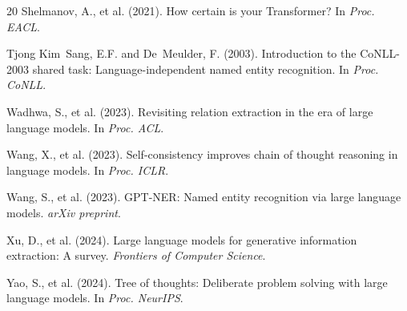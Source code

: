 \documentclass[11pt]{article}
\begin{document}
\begin{thebibliography}{20}
Shelmanov, A., et al. (2021).
\newblock How certain is your Transformer?
\newblock In \emph{Proc. EACL}.

Tjong Kim~Sang, E.F. and De~Meulder, F. (2003).
\newblock Introduction to the CoNLL-2003 shared task: Language-independent named entity recognition.
\newblock In \emph{Proc. CoNLL}.

Wadhwa, S., et al. (2023).
\newblock Revisiting relation extraction in the era of large language models.
\newblock In \emph{Proc. ACL}.

Wang, X., et al. (2023).
\newblock Self-consistency improves chain of thought reasoning in language models.
\newblock In \emph{Proc. ICLR}.

Wang, S., et al. (2023).
\newblock GPT-NER: Named entity recognition via large language models.
\newblock \emph{arXiv preprint}.

Xu, D., et al. (2024).
\newblock Large language models for generative information extraction: A survey.
\newblock \emph{Frontiers of Computer Science}.

Yao, S., et al. (2024).
\newblock Tree of thoughts: Deliberate problem solving with large language models.
\newblock In \emph{Proc. NeurIPS}.

\end{thebibliography}
\end{document}
